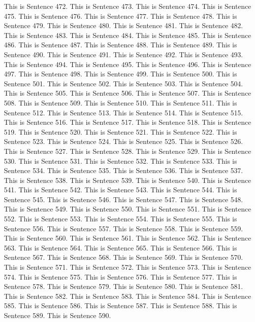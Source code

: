 \documentclass{article}
\begin{document}
This is Sentence 472.
This is Sentence 473.
This is Sentence 474.
This is Sentence 475.
This is Sentence 476.
This is Sentence 477.
This is Sentence 478.
This is Sentence 479.
This is Sentence 480.
This is Sentence 481.
This is Sentence 482.
This is Sentence 483.
This is Sentence 484.
This is Sentence 485.
This is Sentence 486.
This is Sentence 487.
This is Sentence 488.
This is Sentence 489.
This is Sentence 490.
This is Sentence 491.
This is Sentence 492.
This is Sentence 493.
This is Sentence 494.
This is Sentence 495.
This is Sentence 496.
This is Sentence 497.
This is Sentence 498.
This is Sentence 499.
This is Sentence 500.
This is Sentence 501.
This is Sentence 502.
This is Sentence 503.
This is Sentence 504.
This is Sentence 505.
This is Sentence 506.
This is Sentence 507.
This is Sentence 508.
This is Sentence 509.
This is Sentence 510.
This is Sentence 511.
This is Sentence 512.
This is Sentence 513.
This is Sentence 514.
This is Sentence 515.
This is Sentence 516.
This is Sentence 517.
This is Sentence 518.
This is Sentence 519.
This is Sentence 520.
This is Sentence 521.
This is Sentence 522.
This is Sentence 523.
This is Sentence 524.
This is Sentence 525.
This is Sentence 526.
This is Sentence 527.
This is Sentence 528.
This is Sentence 529.
This is Sentence 530.
This is Sentence 531.
This is Sentence 532.
This is Sentence 533.
This is Sentence 534.
This is Sentence 535.
This is Sentence 536.
This is Sentence 537.
This is Sentence 538.
This is Sentence 539.
This is Sentence 540.
This is Sentence 541.
This is Sentence 542.
This is Sentence 543.
This is Sentence 544.
This is Sentence 545.
This is Sentence 546.
This is Sentence 547.
This is Sentence 548.
This is Sentence 549.
This is Sentence 550.
This is Sentence 551.
This is Sentence 552.
This is Sentence 553.
This is Sentence 554.
This is Sentence 555.
This is Sentence 556.
This is Sentence 557.
This is Sentence 558.
This is Sentence 559.
This is Sentence 560.
This is Sentence 561.
This is Sentence 562.
This is Sentence 563.
This is Sentence 564.
This is Sentence 565.
This is Sentence 566.
This is Sentence 567.
This is Sentence 568.
This is Sentence 569.
This is Sentence 570.
This is Sentence 571.
This is Sentence 572.
This is Sentence 573.
This is Sentence 574.
This is Sentence 575.
This is Sentence 576.
This is Sentence 577.
This is Sentence 578.
This is Sentence 579.
This is Sentence 580.
This is Sentence 581.
This is Sentence 582.
This is Sentence 583.
This is Sentence 584.
This is Sentence 585.
This is Sentence 586.
This is Sentence 587.
This is Sentence 588.
This is Sentence 589.
This is Sentence 590.
\end{document}

